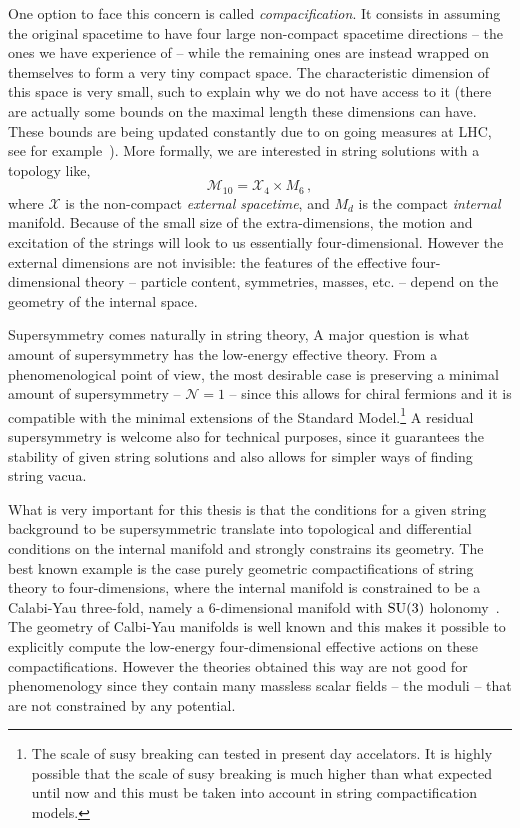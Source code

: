\documentclass[draft]{phd}
\begin{document}
		One option to face this concern is called \emph{compacification}.
		It consists in assuming the original spacetime to have four large non-compact spacetime directions -- the ones we have experience of -- while the remaining ones are instead wrapped on themselves to form a very tiny compact space.
		The characteristic dimension of this space is very small, such to explain why we do not have access to it (there are actually some bounds on the maximal length these dimensions can have. These bounds are being updated constantly due to on going measures at LHC, see for example~\cite{extradim1,extradim2}).
		More formally, we are interested in string solutions with a topology like,
				\begin{equation*}
					\mathcal{M}_{10} = \mathcal{X}_4 \times M_6\, ,
				\end{equation*}
		where $\mathcal{X}$ is the non-compact \emph{external spacetime}, and $M_d$ is the compact \emph{internal} manifold.
		Because of the small size of the extra-dimensions, the motion and excitation of the strings will look to us essentially four-dimensional. 
%		
However the external dimensions are not invisible: the features of the effective four-dimensional theory -- particle content, symmetries, masses, etc. -- 
depend on the geometry of the internal space.

Supersymmetry comes naturally in string theory, A major question is what amount of supersymmetry has the low-energy effective theory.
From a phenomenological point of view, the most desirable case is preserving a minimal amount of supersymmetry -- $\mathcal{N}=1$ -- since this allows for chiral fermions and it is 
compatible with the minimal extensions of the Standard Model.\footnote{%
			The scale of susy breaking can tested in present day accelators. It is highly possible that the scale of susy breaking is much higher than what expected
			until now and this must be taken into account in string compactification models.}
A residual supersymmetry is welcome also for technical purposes, since it guarantees the stability of given string solutions and also allows for simpler ways of finding
string vacua.

What is very important for this thesis is that the conditions for a given string background to be supersymmetric 
 translate into topological and differential conditions on the internal manifold and strongly constrains its geometry.
 The best known example is the case purely geometric compactifications of string theory to four-dimensions, where the internal manifold is constrained to be 
 a Calabi-Yau three-fold, namely a $6$-dimensional manifold with $\mathrm{SU}(3)$ holonomy~\cite{CYcomp}.
The geometry of Calbi-Yau manifolds is well known and this makes it possible to explicitly compute the low-energy four-dimensional effective actions on these compactifications.
However the theories obtained this way are not good for phenomenology since they contain many massless scalar fields -- the moduli -- that are not constrained by any potential.
\end{document}
